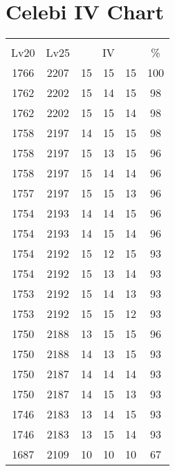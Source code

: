 \documentclass{article}%
\begin{document}
%
\normalsize%
\section{Celebi IV Chart}%
\label{sec:Celebi IV Chart}%
\renewcommand{\arraystretch}{1.5}%
\begin{tabular}{|c|c|c|c|c|c|}%
\hline%
\multicolumn{6}{|c|}{\textcolor{white}{ 
\linebreak{Celebi}
}%
\cellcolor{black}}\\%
\multicolumn{1}{|c}{Lv20}&\multicolumn{1}{c|}{Lv25}&\multicolumn{3}{c|}{IV}&\multicolumn{1}{|c|}{\%}\\%
\hline%
\rowcolor{color100}%
1766&2207&15&15&15&100\\%
\hline%
\rowcolor{color98}%
1762&2202&15&14&15&98\\%
\hline%
\rowcolor{color98}%
1762&2202&15&15&14&98\\%
\hline%
\rowcolor{color98}%
1758&2197&14&15&15&98\\%
\hline%
\rowcolor{color96}%
1758&2197&15&13&15&96\\%
\hline%
\rowcolor{color96}%
1758&2197&15&14&14&96\\%
\hline%
\rowcolor{color96}%
1757&2197&15&15&13&96\\%
\hline%
\rowcolor{color96}%
1754&2193&14&14&15&96\\%
\hline%
\rowcolor{color96}%
1754&2193&14&15&14&96\\%
\hline%
\rowcolor{color93}%
1754&2192&15&12&15&93\\%
\hline%
\rowcolor{color93}%
1754&2192&15&13&14&93\\%
\hline%
\rowcolor{color93}%
1753&2192&15&14&13&93\\%
\hline%
\rowcolor{color93}%
1753&2192&15&15&12&93\\%
\hline%
\rowcolor{color96}%
1750&2188&13&15&15&96\\%
\hline%
\rowcolor{color93}%
1750&2188&14&13&15&93\\%
\hline%
\rowcolor{color93}%
1750&2187&14&14&14&93\\%
\hline%
\rowcolor{color93}%
1750&2187&14&15&13&93\\%
\hline%
\rowcolor{color93}%
1746&2183&13&14&15&93\\%
\hline%
\rowcolor{color93}%
1746&2183&13&15&14&93\\%
\hline%
\rowcolor{color91}%
1687&2109&10&10&10&67\\%
\end{tabular}

%
\end{document}
